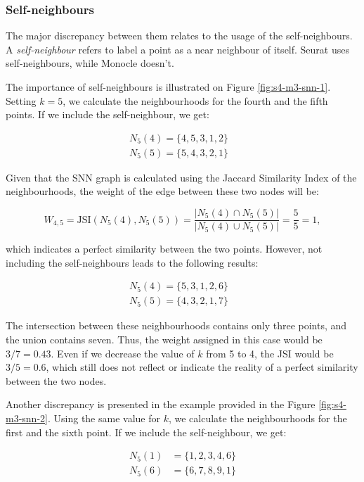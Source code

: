 \subsubsection{Self-neighbours}
The major discrepancy between them relates to the usage of the self-neighbours. A \textit{self-neighbour} refers to label a point as a near neighbour of itself. Seurat uses self-neighbours, while Monocle doesn't.

The importance of self-neighbours is illustrated on Figure \ref{fig:s4-m3-snn-1}. Setting $k = 5$, we calculate the neighbourhoods for the fourth and the fifth points. If we include the self-neighbour, we get:

\[ \begin{aligned}
        N_5(4) = \{4,5,3,1,2\} & \\
        N_5(5) = \{5,4,3,2,1\}
    \end{aligned}
\]

Given that the SNN graph is calculated using the Jaccard Similarity Index of the neighbourhoods, the weight of the edge between these two nodes will be:

\[ W_{4,5} = \textrm{JSI}(N_5(4), N_5(5)) = \frac{|N_5(4) \cap N_5(5)|}{|N_5(4) \cup N_5(5)|} = \frac{5}{5} = 1 ,\]

which indicates a perfect similarity between the two points. However, not including the self-neighbours leads to the following results:

\[ \begin{aligned}
        N_5(4) = \{5,3,1,2,6\} & \\
        N_5(5) = \{4,3,2,1,7\}
    \end{aligned}
\]

The intersection between these neighbourhoods contains only three points, and the union contains seven. Thus, the weight assigned in this case would be $3 / 7 = 0.43$. Even if we decrease the value of $k$ from 5 to 4, the JSI would be $3 / 5 = 0.6$, which still does not reflect or indicate the reality of a perfect similarity between the two nodes.

Another discrepancy is presented in the example provided in the Figure \ref{fig:s4-m3-snn-2}. Using the same value for $k$, we calculate the neighbourhoods for the first and the sixth point. If we include the self-neighbour, we get:

\[ \begin{aligned}
        N_5(1) & = \{1,2,3,4,6\} \\
        N_5(6) & = \{6,7,8,9,1\}
    \end{aligned}
\]

